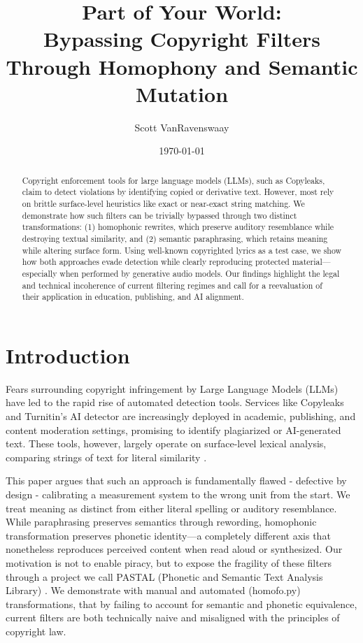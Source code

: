 \documentclass[12pt]{article}
\title{\bfseries Part of Your World:\\Bypassing Copyright Filters Through Homophony and Semantic Mutation}
\author{Scott VanRavenswaay}
\date{\today}
\begin{document}
\maketitle

\begin{abstract}
Copyright enforcement tools for large language models (LLMs), such as Copyleaks, claim to detect violations by identifying copied or derivative text. However, most rely on brittle surface-level heuristics like exact or near-exact string matching. We demonstrate how such filters can be trivially bypassed through two distinct transformations: (1) homophonic rewrites, which preserve auditory resemblance while destroying textual similarity, and (2) semantic paraphrasing, which retains meaning while altering surface form. Using well-known copyrighted lyrics as a test case, we show how both approaches evade detection while clearly reproducing protected material—especially when performed by generative audio models. Our findings highlight the legal and technical incoherence of current filtering regimes and call for a reevaluation of their application in education, publishing, and AI alignment.
\end{abstract}

\section{Introduction}
Fears surrounding copyright infringement by Large Language Models (LLMs) have led to the rapid rise of automated detection tools. Services like Copyleaks and Turnitin's AI detector are increasingly deployed in academic, publishing, and content moderation settings, promising to identify plagiarized or AI-generated text. These tools, however, largely operate on surface-level lexical analysis, comparing strings of text for literal similarity \cite{barron-cedeno-2013,pan2014-overview}.

This paper argues that such an approach is fundamentally flawed - defective by design - calibrating a measurement system to the wrong unit from the start. We treat meaning as distinct from either literal spelling or auditory resemblance. While paraphrasing preserves semantics through rewording, homophonic transformation preserves phonetic identity—a completely different axis that nonetheless reproduces perceived content when read aloud or synthesized. Our motivation is not to enable piracy, but to expose the fragility of these filters through a project we call PASTAL (Phonetic and Semantic Text Analysis Library) \cite{pastal-github}. We demonstrate with manual and automated (homofo.py) \cite{homofo-github} transformations, that by failing to account for semantic and phonetic equivalence, current filters are both technically naive and misaligned with the principles of copyright law.
\end{document}
